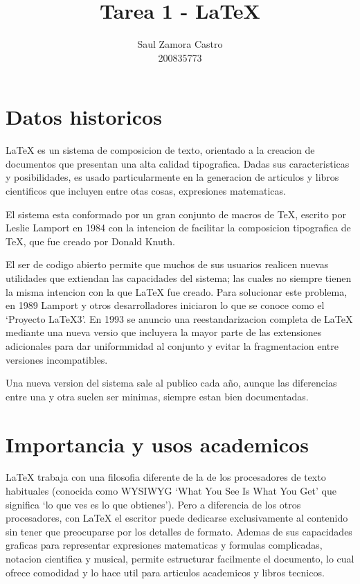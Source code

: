 \documentclass[11pt]{article}
\title{\textbf{Tarea 1 - \LaTeX{}}}
\author{Saul Zamora Castro\\200835773\\}
\date{}
\begin{document}
\maketitle
\tableofcontents

\section{Datos historicos}
\LaTeX{} es un sistema de composicion de texto, orientado a la creacion de documentos que presentan una alta calidad tipografica. Dadas sus caracteristicas y posibilidades, es usado particularmente en la generacion de articulos y libros cientificos que incluyen entre otas cosas, expresiones matematicas.

El sistema esta conformado por un gran conjunto de macros de TeX, escrito por Leslie Lamport en 1984 con la intencion de facilitar la composicion tipografica de TeX, que fue creado por Donald Knuth.

El ser de codigo abierto permite que muchos de sus usuarios realicen nuevas utilidades que extiendan las capacidades del sistema; las cuales no siempre tienen la misma intencion con la que \LaTeX{} fue creado. Para solucionar este problema, en 1989 Lamport y otros desarrolladores iniciaron lo que se conoce como el `Proyecto LaTeX3'. En 1993 se anuncio una reestandarizacion completa de \LaTeX{} mediante una nueva versio que incluyera la mayor parte de las extensiones adicionales para dar uniformmidad al conjunto y evitar la fragmentacion entre versiones incompatibles.

Una nueva version del sistema sale al publico cada año, aunque las diferencias entre una y otra suelen ser minimas, siempre estan bien documentadas.

\section{Importancia y usos academicos}
\LaTeX{} trabaja con una filosofia diferente de la de los procesadores de texto habituales (conocida como WYSIWYG `What You See Is What You Get' que significa `lo que ves es lo que obtienes'). Pero a diferencia de los otros procesadores, con \LaTeX{} el escritor puede dedicarse exclusivamente al contenido sin tener que preocuparse por los detalles de formato. Ademas de sus capacidades graficas para representar expresiones matematicas y formulas complicadas, notacion cientifica y musical, permite estructurar facilmente el documento, lo cual ofrece comodidad y lo hace util para articulos academicos y libros tecnicos.
\end{document}
